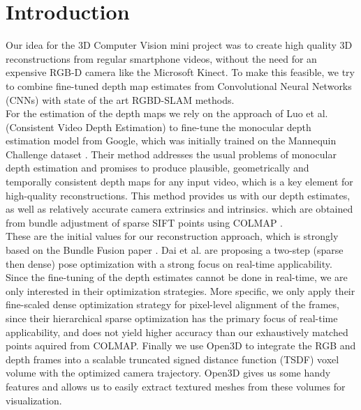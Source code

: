 \chapter{Introduction}
    Our idea for the 3D Computer Vision mini project was to create high quality 3D reconstructions from regular smartphone videos, without the need for an expensive RGB-D camera like the Microsoft Kinect.
    To make this feasible, we try to combine fine-tuned depth map estimates from Convolutional Neural Networks (CNNs) with state of the art RGBD-SLAM methods.\\
    For the estimation of the depth maps we rely on the approach of Luo et al. \cite{luo2020consistent} (Consistent Video Depth Estimation) to fine-tune the monocular depth estimation model from Google, which was initially trained on the Mannequin Challenge dataset \cite{mannequin}.
    Their method addresses the usual problems of monocular depth estimation and promises to produce plausible, geometrically and temporally consistent depth maps for any input video, which is a key element for high-quality reconstructions.
    This method provides us with our depth estimates, as well as relatively accurate camera extrinsics and intrinsics. which are obtained from bundle adjustment of sparse SIFT points using COLMAP \cite{colmap}.\\
    These are the initial values for our reconstruction approach, which is strongly based on the Bundle Fusion paper \cite{dai2017bundlefusion}.
    Dai et al. are proposing a two-step (sparse then dense) pose optimization with a strong focus on real-time applicability.
    Since the fine-tuning of the depth estimates cannot be done in real-time, we are only interested in their optimization strategies.
    More specific, we only apply their fine-scaled dense optimization strategy for pixel-level alignment of the frames, since their hierarchical sparse optimization has the primary focus of real-time applicability, and does not yield higher accuracy than our exhaustively matched points aquired from COLMAP.
    Finally we use Open3D \cite{open3d} to integrate the RGB and depth frames into a scalable truncated signed distance function (TSDF) voxel volume with the optimized camera trajectory. Open3D gives us some handy features and allows us to easily extract textured meshes from these volumes for visualization.\\